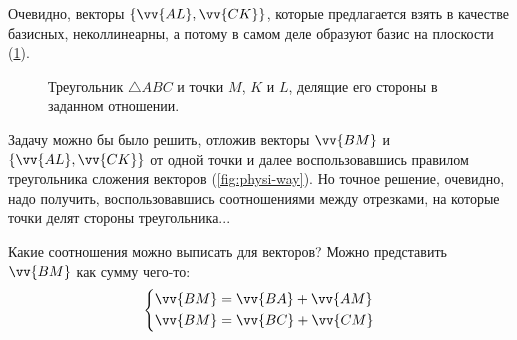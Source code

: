 \documentclass[a4paper,12pt]{article}
\begin{document}
  \begin{solution}
    Очевидно, векторы $\{\vv{AL}, \vv{CK}\}$, которые предлагается взять в качестве базисных, неколлинеарны, а потому в самом деле образуют базис на плоскости (\ref{fig:triangle-for-problem-1-21}).
    
    \begin{figure}[h]
      \centering
      
      
      \caption{Треугольник $\triangle ABC$ и точки $M$, $K$ и $L$, делящие его стороны в заданном отношении.}
      \label{fig:triangle-for-problem-1-21}
    \end{figure}
    
    Задачу можно бы было решить, отложив векторы $\vv{BM}$ и $\{\vv{AL}, \vv{CK}\}$ от одной точки и далее воспользовавшись правилом треугольника сложения векторов (\ref{fig:physi-way}).
    Но точное решение, очевидно, надо получить, воспользовавшись соотношениями между отрезками, на которые точки делят стороны треугольника...
    
    Какие соотношения можно выписать для векторов?
    Можно представить $\vv{BM}$ как сумму чего-то:
    \[
      \left\{
        \begin{aligned}
          &\vv{BM} = \vv{BA} + \vv{AM}\\
          &\vv{BM} = \vv{BC} + \vv{CM}
        \end{aligned}
      \right.
    \]
    

\end{solution}
\end{document}
